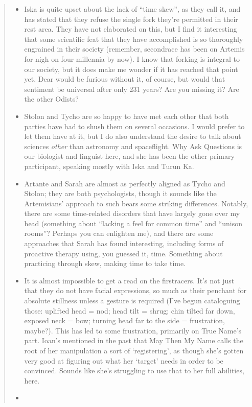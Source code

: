 \begin{quote}
\begin{itemize}
\tightlist
\item
  Iska is quite upset about the lack of ``time skew'', as they call it, and has stated that they refuse the single fork they're permitted in their rest area. They have not elaborated on this, but I find it interesting that some scientific feat that they have accomplished is so thoroughly engrained in their society (remember, secondrace has been on Artemis for nigh on four millennia by now). I know that forking is integral to our society, but it does make me wonder if it has reached that point yet. Dear would be furious without it, of course, but would that sentiment be universal after only 231 years? Are you missing it? Are the other Odists?
\item
  Stolon and Tycho are so happy to have met each other that both parties have had to shush them on several occasions. I would prefer to let them have at it, but I do also understand the desire to talk about sciences \emph{other} than astronomy and spaceflight. Why Ask Questions is our biologist and linguist here, and she has been the other primary participant, speaking mostly with Iska and Turun Ka.
\item
  Artante and Sarah are almost as perfectly aligned as Tycho and Stolon; they are both psychologists, though it sounds like the Artemisians' approach to such bears some striking differences. Notably, there are some time-related disorders that have largely gone over my head (something about ``lacking a feel for common time'' and ``unison rooms''? Perhaps you can enlighten me), and there are some approaches that Sarah has found interesting, including forms of proactive therapy using, you guessed it, time. Something about practicing through skew, making time to take time.
\item
  It is almost impossible to get a read on the firstracers. It's not just that they do not have facial expressions, so much as their penchant for absolute stillness unless a gesture is required (I've begun cataloguing those: uplifted head = nod; head tilt = shrug; chin tilted far down, exposed neck = bow; turning head far to the side = frustration, maybe?). This has led to some frustration, primarily on True Name's part. Ioan's mentioned in the past that May Then My Name calls the root of her manipulation a sort of `registering', as though she's gotten very good at figuring out what her `target' needs in order to be convinced. Sounds like she's struggling to use that to her full abilities, here.
\item

\end{itemize}
\end{quote}
